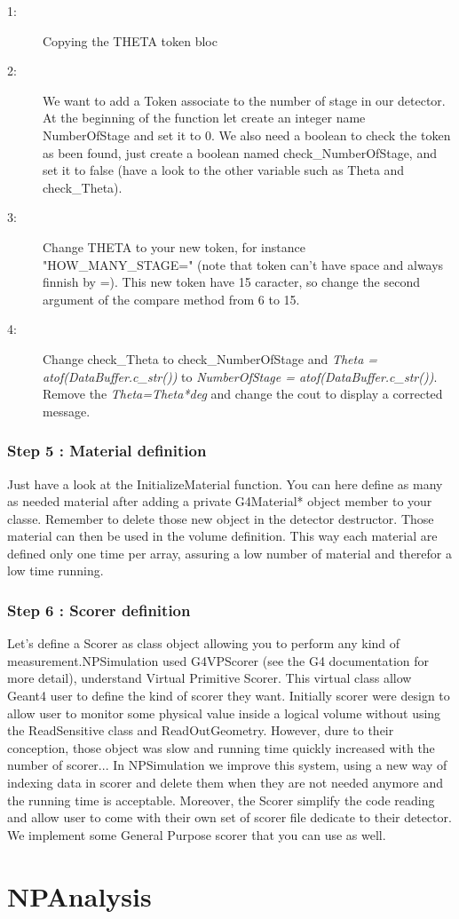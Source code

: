 \documentclass{book}
\begin{document}
		\begin{description}
			\item[1:] Copying the THETA token bloc
			\item[2:] We want to add a Token associate to the number of stage in our detector. At the beginning of the function let create an integer name NumberOfStage and set it to 0. We also need a boolean to check the token as been found, just create a boolean named check\_NumberOfStage, and set it to false (have a look to the other variable such as Theta and check\_Theta).
			\item[3:] Change THETA to your new token, for instance "HOW\_MANY\_STAGE=" (note that token can't have space and always finnish by =). This new token have 15 caracter, so change the second argument of the compare method from 6 to 15.
			\item[4:] Change check\_Theta to check\_NumberOfStage and \emph{Theta = atof(DataBuffer.c\_str())} to \emph{NumberOfStage = atof(DataBuffer.c\_str())}. Remove the \emph{Theta=Theta*deg} and change the cout to display a corrected message.
		\end{description}

		
		\subsection{Step 5 : Material definition}

		Just have a look at the InitializeMaterial function. You can here define as many as needed material after adding a private G4Material* object member to your classe. Remember to delete those new object in the detector destructor. Those material can then be used in the volume definition. This way each material are defined only one time per array, assuring a low number of material and therefor a low time running.

		\subsection{Step 6 : Scorer definition}
	
	Let's define a Scorer as class object allowing you to perform any kind of measurement.NPSimulation used G4VPScorer (see the G4 documentation for more detail), understand Virtual Primitive Scorer. This virtual class allow Geant4 user to define the kind of scorer they want. Initially scorer were design to allow user to monitor some physical value inside a logical volume without using the ReadSensitive class and ReadOutGeometry. However, dure to their conception, those object was slow and running time quickly increased with the number of scorer... In NPSimulation we improve this system, using a new way of indexing data in scorer and delete them when they are not needed anymore and the running time is acceptable. Moreover, the Scorer simplify the code reading and allow user to come with their own set of scorer file dedicate to their detector. We implement some General Purpose scorer that you can use as well.

\chapter[NPAnalysis]{NPAnalysis}
\end{document}
